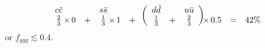 \documentclass{cornell}
\begin{document}
\begin{equation}
  \begin{array}{c} c\bar{c} \\ \frac{2}{3} \end{array}
  \mbox{\hspace{-0.3 cm}}
  \begin{array}{c} \\ \times \end{array}
  \mbox{\hspace{-0.3 cm}}
  \begin{array}{c} \\ 0 \end{array}
  \begin{array}{c} \\ + \end{array}
  \begin{array}{c} s\bar{s} \\ \frac{1}{3} \end{array}
  \mbox{\hspace{-0.3 cm}}
  \begin{array}{c} \\ \times \end{array}
  \mbox{\hspace{-0.3 cm}}
  \begin{array}{c} \\ 1 \end{array}
  \begin{array}{c} \\ + \end{array}
  \left(
  \begin{array}{c} d\bar{d} \\ \frac{1}{3} \end{array}
  \begin{array}{c} \\ + \end{array}
  \begin{array}{c} u\bar{u} \\ \frac{2}{3} \end{array}
  \right)
  \mbox{\hspace{-0.3 cm}}
  \begin{array}{c} \\ \times \end{array}
  \mbox{\hspace{-0.3 cm}}
  \begin{array}{c} \\ 0.5 \end{array}
  \begin{array}{c} \\ = \end{array}
  \begin{array}{c} \\ 42\% \end{array}
\end{equation}
or $f_{ggg} \lesssim 0.4$.
\end{document}
